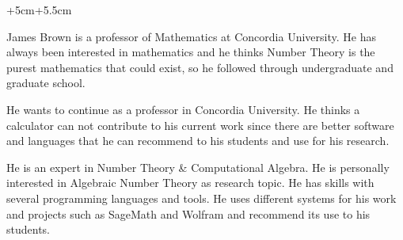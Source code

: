 \documentclass[../main.tex]{subfiles} %
\begin{document}
\begin{changemargin}{+5cm}{+5.5cm}

\aboutme{} %



\makeprofiles %



James Brown is a professor of Mathematics at Concordia University. He has always been interested in mathematics and he thinks Number Theory is the purest mathematics that could exist, so he followed through undergraduate and graduate school. \newline


He wants to continue as a professor in Concordia University. He thinks a calculator can not contribute to his current work since there are better software and languages that he can recommend to his students and use for his research.\newline



He is an expert in Number Theory \& Computational Algebra. He is personally interested in Algebraic Number Theory as research topic. He has skills with several programming languages and tools. He uses different systems for his work and projects such as SageMath and Wolfram and recommend its use to his students.\newline



\end{changemargin}
\end{document}
